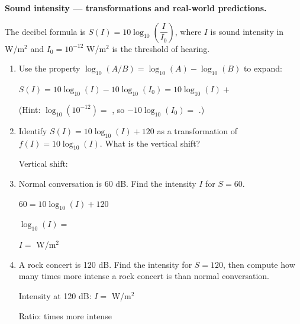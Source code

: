 \documentclass[10pt]{article}
\begin{document}
\begin{tcolorbox}[colback=white, colframe=black!40,
    title=\textbf{Tier E --- Extension},
    fonttitle=\bfseries, arc=2mm, left=3mm, right=3mm, top=2mm, bottom=2mm]

\textbf{Sound intensity --- transformations and real-world predictions.}

\vspace{4pt}
The decibel formula is $S(I) = 10\log_{10}\!\left(\dfrac{I}{I_0}\right)$,
where $I$ is sound intensity in W/m$^2$ and $I_0 = 10^{-12}$ W/m$^2$ is the
threshold of hearing.

\begin{enumerate}[leftmargin=1.8em, itemsep=10pt]

\item Use the property $\log_{10}(A/B) = \log_{10}(A) - \log_{10}(B)$ to expand:

\vspace{4pt}
$S(I) = 10\log_{10}(I) - 10\log_{10}(I_0) = 10\log_{10}(I) + $ \blank{3cm}

\vspace{2pt}
(Hint: $\log_{10}(10^{-12}) = $ \blank{2cm}, so $-10\log_{10}(I_0) = $ \blank{2cm}.)

\item Identify $S(I) = 10\log_{10}(I) + 120$ as a transformation of $f(I) = 10\log_{10}(I)$.
      What is the vertical shift?

\vspace{4pt}
Vertical shift: \blank{3cm}

\item Normal conversation is 60 dB. Find the intensity $I$ for $S = 60$.

\vspace{4pt}
$60 = 10\log_{10}(I) + 120$

\vspace{4pt}
$\log_{10}(I) = $ \blank{2cm}

\vspace{4pt}
$I = $ \blank{4cm} W/m$^2$

\item A rock concert is 120 dB. Find the intensity for $S = 120$, then compute how many
      times more intense a rock concert is than normal conversation.

\vspace{4pt}
Intensity at 120 dB: $I = $ \blank{4cm} W/m$^2$

\vspace{4pt}
Ratio: \blank{6cm} times more intense

\end{enumerate}
\end{tcolorbox}
\end{document}
